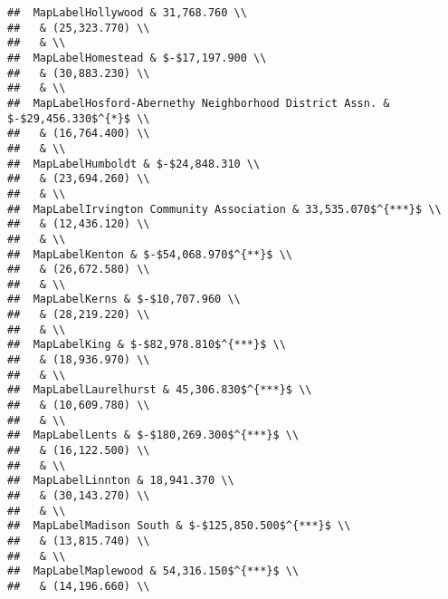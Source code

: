 \documentclass[]{article}
\begin{document}
\begin{verbatim}
##  MapLabelHollywood & 31,768.760 \\ 
##   & (25,323.770) \\ 
##   & \\ 
##  MapLabelHomestead & $-$17,197.900 \\ 
##   & (30,883.230) \\ 
##   & \\ 
##  MapLabelHosford-Abernethy Neighborhood District Assn. & $-$29,456.330$^{*}$ \\ 
##   & (16,764.400) \\ 
##   & \\ 
##  MapLabelHumboldt & $-$24,848.310 \\ 
##   & (23,694.260) \\ 
##   & \\ 
##  MapLabelIrvington Community Association & 33,535.070$^{***}$ \\ 
##   & (12,436.120) \\ 
##   & \\ 
##  MapLabelKenton & $-$54,068.970$^{**}$ \\ 
##   & (26,672.580) \\ 
##   & \\ 
##  MapLabelKerns & $-$10,707.960 \\ 
##   & (28,219.220) \\ 
##   & \\ 
##  MapLabelKing & $-$82,978.810$^{***}$ \\ 
##   & (18,936.970) \\ 
##   & \\ 
##  MapLabelLaurelhurst & 45,306.830$^{***}$ \\ 
##   & (10,609.780) \\ 
##   & \\ 
##  MapLabelLents & $-$180,269.300$^{***}$ \\ 
##   & (16,122.500) \\ 
##   & \\ 
##  MapLabelLinnton & 18,941.370 \\ 
##   & (30,143.270) \\ 
##   & \\ 
##  MapLabelMadison South & $-$125,850.500$^{***}$ \\ 
##   & (13,815.740) \\ 
##   & \\ 
##  MapLabelMaplewood & 54,316.150$^{***}$ \\ 
##   & (14,196.660) \\ 

\end{verbatim}
\end{document}
